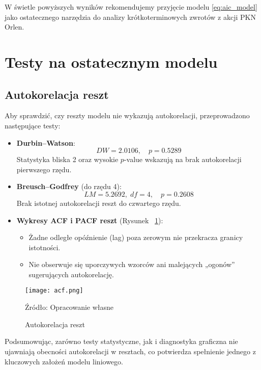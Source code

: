 \documentclass[12pt, twoside]{article}
\begin{document}
W świetle powyższych wyników rekomendujemy przyjęcie modelu \eqref{eq:aic_model} jako ostatecznego narzędzia do analizy krótkoterminowych zwrotów z akcji PKN Orlen.

\section{Testy na ostatecznym modelu}

\subsection*{Autokorelacja reszt}
\label{sec:autokorelacja}

Aby sprawdzić, czy reszty modelu nie wykazują autokorelacji, przeprowadzono następujące testy:

\begin{itemize}
  \item \textbf{Durbin–Watson}:
    \[
      DW = 2.0106,\quad p = 0.5289
    \]
    Statystyka bliska 2 oraz wysokie \(p\)-value wskazują na brak autokorelacji pierwszego rzędu.

  \item \textbf{Breusch–Godfrey} (do rzędu 4):
    \[
      LM = 5.2692,\; df = 4,\quad p = 0.2608
    \]
    Brak istotnej autokorelacji reszt do czwartego rzędu.

  \item \textbf{Wykresy ACF i PACF reszt} (Rysunek ~\ref{fig:acf}):
    \begin{itemize}
      \item Żadne odległe opóźnienie (lag) poza zerowym nie przekracza granicy istotności.
      \item Nie obserwuje się uporczywych wzorców ani malejących „ogonów” sugerujących autokorelację.
    \end{itemize}
\end{itemize}

\begin{figure}[H]
    \centering
    \texttt{[image: acf.png]}
    \caption{Autokorelacja reszt}
    \label{fig:acf}
    \vspace{0.1cm}
    {\parbox[t]{\linewidth}{\raggedright Źródło: Opracowanie własne}}

\end{figure}

\noindent
Podsumowując, zarówno testy statystyczne, jak i diagnostyka graficzna nie ujawniają obecności autokorelacji w resztach, co potwierdza spełnienie jednego z kluczowych założeń modelu liniowego.
\end{document}
